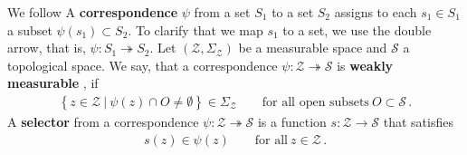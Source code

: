 We follow \cite{Aliprantis2007}
A \textbf{correspondence} $\psi$ from a set $S_1$ to a set $S_2$ assigns to each $s_1\in S_1$ a subset $\psi(s_1)\subset S_2$.
To clarify that we map $s_1$ to a set, we use the double arrow, that is,
$
  \psi
  \colon
  S_1
  \twoheadrightarrow
  S_2
$.
  Let 
  $(\mathcal{Z},\Sigma_{\mathcal{Z}})$ be a measurable space and $\mathcal{S}$  a topological space.
  We say, that a correspondence 
  $
  \psi
  \colon
  \mathcal{Z}
  \twoheadrightarrow
  \mathcal{S}
  $
  is 
  \textbf{
  weakly measurable
  },
  if
  \begin{gather*}
    \left\{ 
      z\in \mathcal{Z}
      \ 
      |
      \ 
      \psi(z)
      \cap
      O
      \neq
      \emptyset
    \right\}
    \in
    \Sigma_{\mathcal{Z}}
    \qquad
    \text{for all open subsets}
    \ 
    O\subset \mathcal{S}
    \,.
  \end{gather*}
  A \textbf{selector} from a correspondence $\psi\colon \mathcal{Z}\twoheadrightarrow \mathcal{S}$ is a function $s\colon \mathcal{Z}\to \mathcal{S}$ that satisfies 
  \begin{align*}
s(z)\in\psi(z)
\qquad
\text{for all}\ 
z\in\mathcal{Z}
\,.
  \end{align*}
  

